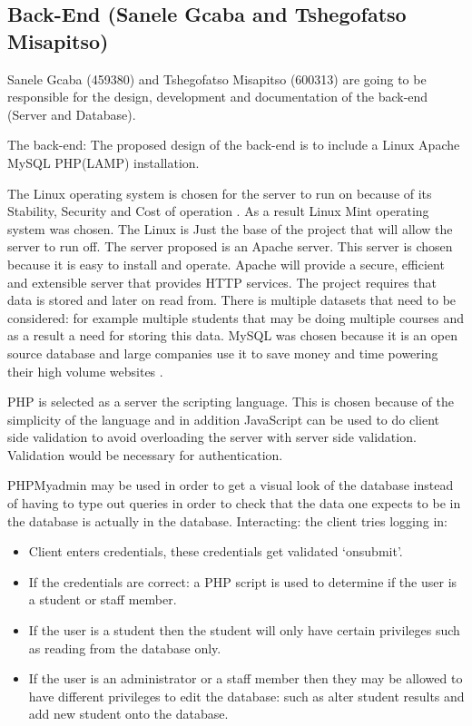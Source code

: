 \documentclass[10pt,onecolumn]{lab}
\begin{document}
\subsection{Back-End (Sanele Gcaba and Tshegofatso Misapitso)}
Sanele Gcaba (459380) and Tshegofatso Misapitso (600313)  are going to be responsible for the design, development and documentation of the back-end (Server and Database).

The back-end:
The proposed design of the back-end is to include a Linux Apache MySQL PHP(LAMP) installation.

The Linux operating system is chosen for the server to run on because of its Stability, Security and Cost of operation \cite{ref1}.   
As a result Linux Mint operating system was chosen.
The Linux is Just the base of the project that will allow the server to run off. The server proposed is an Apache server. This server is chosen because it is easy to install and operate. Apache will provide a secure, efficient and extensible server that provides HTTP services.
The project requires that data is stored and later on read from. There is multiple datasets that need to be considered: for example multiple students that may be doing multiple courses and as a result a need for storing this data. MySQL was chosen because it is an open source database and large companies use it to save money and time powering their high volume websites \cite{ref2}.

PHP is  selected as a server the scripting language. This is chosen because of the simplicity of the language and in addition JavaScript can be used to do client side validation to avoid overloading the server with server side validation. Validation would be necessary for authentication. 

PHPMyadmin may be used in order to get a visual look of the database instead of having to type out queries in order to check that the data one expects to be in the database is actually in the database. 
Interacting: the client tries logging in:

\begin{itemize}
\item Client enters credentials, these credentials get validated ‘onsubmit’.
\item If the credentials are correct: a PHP script is used to determine if the user is a  student or staff member.
\item If the user is a student then the student will only have certain privileges such as reading from the database only.
\item If the user is an administrator or a staff member then they may be allowed to have different privileges to edit the database: such as alter student results and add new student onto the database.
\end{itemize}
\end{document}
